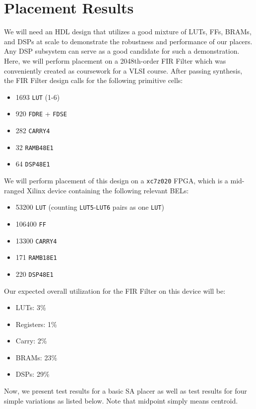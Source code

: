 \section{Placement Results}
\label{sec:results}


We will need an HDL design that utilizes a good mixture of LUTs, FFs, BRAMs, and DSPs at scale to demonstrate the robustness and performance of our placers. 
Any DSP subsystem can serve as a good candidate for such a demonstration. 
Here, we will perform placement on a 2048th-order FIR Filter which was conveniently created as coursework for a VLSI course. 
After passing synthesis, the FIR Filter design calls for the following primitive cells:
\begin{itemize}
    \item 1693 \texttt{LUT} (1-6)
    \item 920 \texttt{FDRE} + \texttt{FDSE}
    \item 282 \texttt{CARRY4}
    \item 32 \texttt{RAMB48E1}
    \item 64 \texttt{DSP48E1}
\end{itemize}

We will perform placement of this design on a \texttt{xc7z020} FPGA, which is a mid-ranged Xilinx device containing the following relevant BELs:
\begin{itemize}
    \item 53200 \texttt{LUT} (counting \texttt{LUT5}-\texttt{LUT6} pairs as one \texttt{LUT})
    \item 106400 \texttt{FF}
    \item 13300 \texttt{CARRY4}
    \item 171 \texttt{RAMB18E1}
    \item 220 \texttt{DSP48E1}
\end{itemize}

Our expected overall utilization for the FIR Filter on this device will be:
\begin{itemize}
    \item LUTs: 3\%
    \item Registers: 1\%
    \item Carry: 2\%
    \item BRAMs: 23\%
    \item DSPs: 29\%
\end{itemize}

Now, we present test results for a basic SA placer as well as test results for four simple variations as listed below. 
Note that midpoint simply means centroid.

